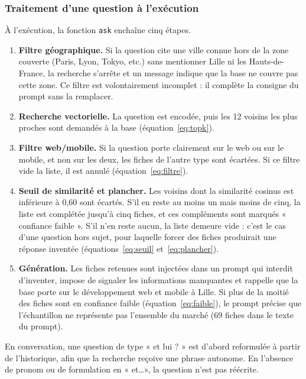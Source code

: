 \subsubsection{Traitement d'une question à l'exécution}

À l'exécution, la fonction \texttt{ask} enchaîne cinq étapes.

\begin{enumerate}
    \item \textbf{Filtre géographique.} Si la question cite une ville connue hors de la zone couverte (Paris,
    Lyon, Tokyo, etc.) sans mentionner Lille ni les Hauts-de-France, la recherche s'arrête et un message
    indique que la base ne couvre pas cette zone. Ce filtre est volontairement incomplet : il complète la
    consigne du prompt sans la remplacer.
    \item \textbf{Recherche vectorielle.} La question est encodée, puis les 12 voisins les plus proches sont
    demandés à la base (équation~\ref{eq:topk}).
    \item \textbf{Filtre web/mobile.} Si la question porte clairement sur le web ou sur le mobile, et non sur
    les deux, les fiches de l'autre type sont écartées. Si ce filtre vide la liste, il est annulé
    (équation~\ref{eq:filtre}).
    \item \textbf{Seuil de similarité et plancher.} Les voisins dont la similarité cosinus est inférieure à
    0,60 sont écartés. S'il en reste au moins un mais moins de cinq, la liste est complétée jusqu'à cinq
    fiches, et ces compléments sont marqués « confiance faible ». S'il n'en reste aucun, la liste demeure
    vide : c'est le cas d'une question hors sujet, pour laquelle forcer des fiches produirait une réponse
    inventée (équations~\ref{eq:seuil} et~\ref{eq:plancher}).
    \item \textbf{Génération.} Les fiches retenues sont injectées dans un prompt qui interdit d'inventer,
    impose de signaler les informations manquantes et rappelle que la base porte sur le développement web et
    mobile à Lille. Si plus de la moitié des fiches sont en confiance faible (équation~\ref{eq:faible}), le
    prompt précise que l'échantillon ne représente pas l'ensemble du marché (69 fiches dans le texte du
    prompt).
\end{enumerate}

En conversation, une question de type « et lui ? » est d'abord reformulée à partir de l'historique, afin que
la recherche reçoive une phrase autonome. En l'absence de pronom ou de formulation en « et\ldots », la
question n'est pas réécrite.

